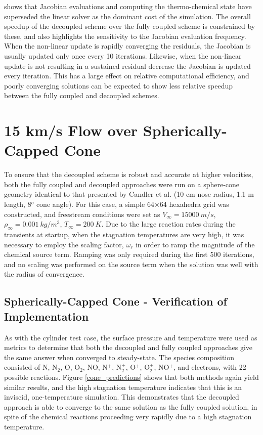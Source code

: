  shows that Jacobian evaluations and computing the
thermo-chemical state have superseded the linear solver as the dominant cost of
the simulation.  The overall speedup of the decoupled scheme over the fully
coupled scheme is constrained by these, and also highlights the sensitivity to
the Jacobian evaluation frequency.  When the non-linear update is rapidly
converging the residuals, the Jacobian is usually updated only once every 10
iterations.  Likewise, when the non-linear update is not resulting in a
sustained residual decrease the Jacobian is updated every iteration.  This has a
large effect on relative computational efficiency, and poorly converging
solutions can be expected to show less relative speedup between the fully
coupled and decoupled schemes.

\section{15 km/s Flow over Spherically-Capped Cone}
\label{sec:15-kps-sphere-cone}

To ensure that the decoupled scheme is robust and accurate at higher velocities, both the
fully coupled and decoupled approaches were run on a sphere-cone geometry
identical to that presented by Candler et al. \cite{candler} (10 cm nose
radius, 1.1 m length, 8$^o$ cone angle).  For this case, a simple 64$\times$64
hexahedra grid was constructed, and freestream conditions were set as
$V_{\infty} = 15000\ m/s$, $\rho_{\infty}=0.001\ kg/m^3$, $T_\infty = 200\ K$.
Due to the large reaction rates during the transients at startup, when the
stagnation temperatures are very high, it was necessary to employ the scaling
factor, $\omega_r$ in order to ramp the magnitude of the chemical source term.
Ramping was only required during the first 500 iterations, and no scaling was
performed on the source term when the solution was well with the radius of
convergence.

\subsection{Spherically-Capped Cone - Verification of Implementation} 

As with the cylinder test case, the surface pressure and temperature were used
as metrics to determine that both the decoupled and fully coupled approaches
give the same answer when converged to steady-state. The species composition
consisted of N, $\text{N}_2$, O, $\text{O}_2$, NO, N$^+$, $\text{N}_2^+$, O$^+$,
$\text{O}_2^+$, NO$^+$, and electrons, with 22 possible reactions. Figure
\ref{cone_predictions} shows that both methods again yield similar results, and
the high stagnation temperature indicates that this is an inviscid,
one-temperature simulation.  This demonstrates that the decoupled approach is
able to converge to the same solution as the fully coupled solution, in spite of
the chemical reactions proceeding very rapidly due to a high stagnation
temperature.

